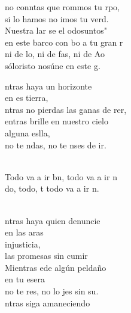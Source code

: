 \documentclass[12pt]{article}
\begin{document}
\begin{multicols*}{2}
\begin{cancion}
	no conntas que rommos tu rpo,\\
	si lo hamos no imos tu verd.\\
\jump
	Nuestra lar se el odosuntos"\\
	en este barco con bo a tu gran r\\
	ni de lo, ni de fas, ni de Ao\\
	sóloristo nosúne en este g.\\
\end{cancion}%

\begin{cancion}%
	ntras haya un horizonte \\
	en es tierra,\\
	ntras no pierdas las ganas de rer,\\
	entras brille en nuestro cielo\\
	alguna eslla,\\
	no te ndas, no te nses de ir.\\\jump\\
	\begin{chorus}%
	Todo va a ir bn, todo va a ir n\\
	do, todo, t todo va a ir n.\\
	\end{chorus}%
	\jump\\
	ntras haya quien denuncie \\
	en las aras\\
	injusticia, \\
	las promesas sin cumir\\
	Mientras ede algún peldaño \\
	en tu esera\\
	no te res, no lo jes sin su.\\
\jump
	ntras siga amaneciendo\\

\end{cancion}
\end{multicols*}
\end{document}

